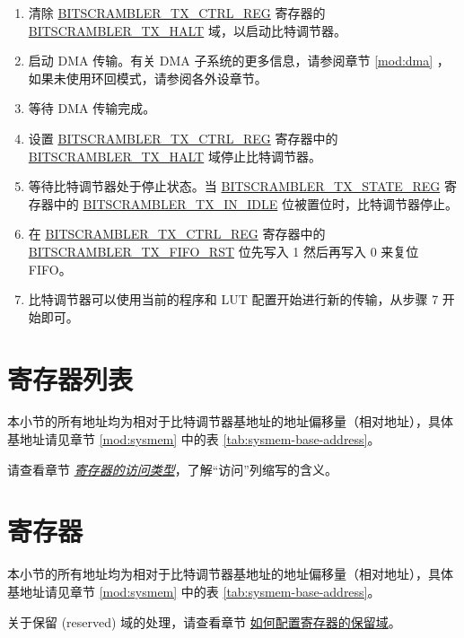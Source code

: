 \documentclass[main\_\_CN.tex]{subfiles}
\begin{document}
\begin{enumerate}
    \item 清除 \hyperref[regdesc:BITSCRAMBLERTXCTRLREG]{BITSCRAMBLER\_TX\_CTRL\_REG} 寄存器的\hyperref[fielddesc:BITSCRAMBLERTXHALT]{BITSCRAMBLER\_TX\_HALT} 域，以启动比特调节器。
    \item 启动 DMA 传输。有关 DMA 子系统的更多信息，请参阅章节 \ref{mod:dma} \textit{}，如果未使用环回模式，请参阅各外设章节。
    \item 等待 DMA 传输完成。
    \item 设置 \hyperref[regdesc:BITSCRAMBLERTXCTRLREG]{BITSCRAMBLER\_TX\_CTRL\_REG} 寄存器中的 \hyperref[fielddesc:BITSCRAMBLERTXHALT]{BITSCRAMBLER\_TX\_HALT} 域停止比特调节器。
    \item 等待比特调节器处于停止状态。当 \hyperref[regdesc:BITSCRAMBLERTXSTATEREG]{BITSCRAMBLER\_TX\_STATE\_REG} 寄存器中的 \hyperref[fielddesc:BITSCRAMBLERTXINIDLE]{BITSCRAMBLER\_TX\_IN\_IDLE} 位被置位时，比特调节器停止。
    \item 在 \hyperref[regdesc:BITSCRAMBLERTXCTRLREG]{BITSCRAMBLER\_TX\_CTRL\_REG} 寄存器中的 \hyperref[fielddesc:BITSCRAMBLERTXFIFORST]{BITSCRAMBLER\_TX\_FIFO\_RST} 位先写入 1 然后再写入 0 来复位 FIFO。
    \item 比特调节器可以使用当前的程序和 LUT 配置开始进行新的传输，从步骤 7 开始即可。
\end{enumerate}



\newpage
\hypertarget{bitscrm-reg-summ}{}
\section{寄存器列表}
\label{sec:bitscrm-reg-summ}

本小节的所有地址均为相对于比特调节器基地址的地址偏移量（相对地址），具体基地址请见章节 \ref{mod:sysmem} \textit{} 中的表 \ref{tab:sysmem-base-address}。

请查看章节 \hyperref[glossary-access-types]{\textit{寄存器的访问类型}}，了解“访问”列缩写的含义。






\newpage
\section{寄存器}

本小节的所有地址均为相对于比特调节器基地址的地址偏移量（相对地址），具体基地址请见章节 \ref{mod:sysmem} \textit{} 中的表 \ref{tab:sysmem-base-address}。

关于保留 (reserved) 域的处理，请查看章节 \hyperref[programming-reserved-field]{如何配置寄存器的保留域}。


\end{document}
